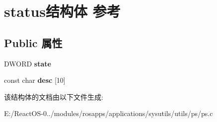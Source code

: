 \hypertarget{structstatus}{}\section{status结构体 参考}
\label{structstatus}
\subsection*{Public 属性}
\begin{DoxyCompactItemize}
\item 
\mbox{\label{structstatus_a8d0c636aae3a4f1743dc313e898727e1}} 
D\+W\+O\+RD {\bfseries state}
\item 
\mbox{\label{structstatus_a35b5c20c8d5f367d5d65945f1f6eda80}} 
const char {\bfseries desc} \mbox{[}10\mbox{]}
\end{DoxyCompactItemize}


该结构体的文档由以下文件生成\+:\begin{DoxyCompactItemize}
\item 
E\+:/\+React\+O\+S-\/0../modules/rosapps/applications/sysutils/utils/ps/ps.\+c\end{DoxyCompactItemize}
